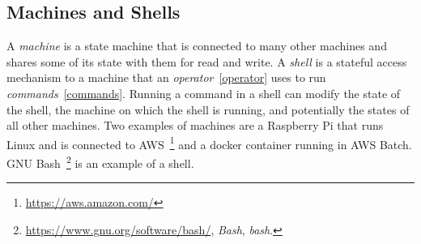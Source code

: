 \subsection{Machines and Shells}
\label{machine}

A \emph{machine} is a state machine that is connected to many other machines and shares some of its state with them for read and write. A \emph{shell} is a stateful access mechanism to a machine that an \emph{operator}~\ref{operator} uses to run \emph{commands}~\ref{commands}. Running a command in a shell can modify the state of the shell, the machine on which the shell is running, and potentially the states of all other machines. Two examples of machines are a Raspberry Pi that runs Linux and is connected to AWS~\footnote{\url{https://aws.amazon.com/}} and a docker container running in AWS Batch. GNU Bash~\footnote{\url{https://www.gnu.org/software/bash/}, \emph{Bash}, \emph{bash}.} is an example of a shell.